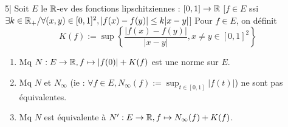 

\begin{statementbox}
5| Soit $E$ le $\mathbb R$-ev des fonctions lipschitziennes : $[0, 1] \to \mathbb R$ [$f \in E$ ssi $\exists k \in \mathbb R_+ / \forall (x, y) \in [0, 1]^2, |f(x) - f(y)| \leq k|x - y|$] Pour $f \in E$, on définit
\[ K(f) := \sup \left\{ \frac{|f(x) - f(y)|}{|x - y|}, x \neq y \in [0, 1]^2 \right\} \]
\begin{enumerate}[label=\alph*)]
  \item Mq $N : E \to \mathbb R, f \mapsto |f(0)| + K(f)$ est une norme sur $E$.
  \item Mq $N$ et $N_\infty$ (ie : $\forall f \in E, N_\infty(f) := \sup_{t \in [0, 1]} |f(t)|$) ne sont pas équivalentes.
  \item Mq $N$ est équivalente à $N' : E \to \mathbb R, f \mapsto N_\infty(f) + K(f)$.
\end{enumerate}
\end{statementbox}

